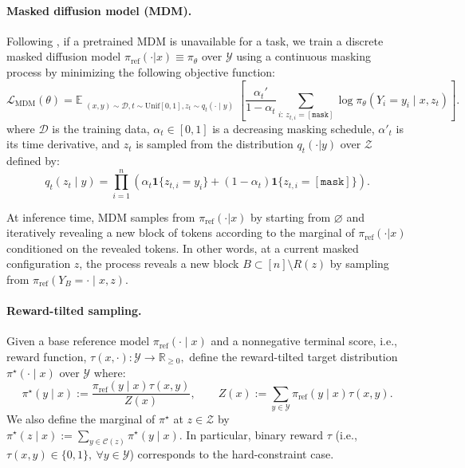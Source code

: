 \documentclass{article}
\numberwithin{theorem}{section}
\numberwithin{proposition}{section}
\numberwithin{corollary}{section}
\numberwithin{lemma}{section}
\numberwithin{conjecture}{section}
\numberwithin{remark}{section}
\numberwithin{definition}{section}
\numberwithin{assumption}{section}
\numberwithin{example}{section}
\newcommand{\calC}{{\mathcal{C}}}
\newcommand{\calY}{{\mathcal{Y}}}
\newcommand{\calZ}{{\mathcal{Z}}}
\newcommand{\lbra}[1]{\left[#1\right]}
\newcommand{\sbra}[1]{\left(#1\right)}
\providecommand{\base}{\pi_{\mathrm{ref}}}
\begin{document}
\paragraph{Masked diffusion model (MDM).}
Following \cite{sahoo2024simple}, if a pretrained MDM is unavailable for a task, we train a discrete masked diffusion model $\base(\cdot | x)\equiv \pi_\theta$ over $\calY $ using a continuous masking process by minimizing the following objective function: \begin{equation*}
    \mathcal L_{\mathrm{MDM}}(\theta) =\mathbb E_{\substack{(x,y)\sim\mathcal D,  t\sim\mathrm{Unif}[0,1],  z_t\sim q_t(\cdot\mid y)}}\lbra{\frac{\alpha_t'}{1-\alpha_t}\sum_{i:\,z_{t,i}=\mathtt{[mask]}}\log \pi_\theta(Y_i=y_i\mid x,z_t)}.
\end{equation*}
where $\mathcal{D}$ is the training data, $\alpha_t \in [0,1]$ is a decreasing masking schedule, $\alpha'_t$ is its time derivative, and $z_t$ is sampled from the distribution $q_t(\cdot | y)$ over $\mathcal{Z}$ defined by:
\begin{equation*}
    q_t(z_t\mid y) = \prod_{i=1}^n \sbra{\alpha_t \mathbf 1\{z_{t,i}=y_i\} + (1-\alpha_t)\mathbf 1\{z_{t,i}=\mathtt{[mask]}\}}.
\end{equation*}


At inference time, MDM samples from $\base(\cdot |x)$ by starting from $\varnothing$ and iteratively revealing a new block of tokens according to the marginal of $\base(\cdot |x)$ conditioned on the revealed tokens. In other words, at a  current masked configuration
$z$,  the process reveals a new block $B \subset [n]\setminus R(z)$ by sampling from  $\base(Y_B=\cdot \mid x,z)$.


\paragraph{Reward-tilted sampling.}


Given a base reference model $\base(\cdot\mid x)$ and a nonnegative terminal score, i.e., reward function, $\tau(x, \cdot): \calY\to \mathbb{R}_{\geq 0}, $ 
define the
reward-tilted target distribution $ \pi^\star( \cdot\mid x) $ over $\calY$ where:
\begin{equation*}
    \pi^\star(y\mid x)
    :=
    \frac{\base(y\mid x)\tau(x,y)}
    {Z(x)},
    \qquad
    Z(x):=\sum_{y\in\calY}\base(y\mid x)\tau(x,y).
\end{equation*}
We also define the marginal of $\pi^\star$ at $z\in \calZ$ by $\pi^\star(z\mid x) := \sum_{y\in\calC(z) } \pi^\star(y\mid x).$ In particular, binary reward $\tau $ (i.e., $\tau(x,y) \in \{0,1\}, \ \forall y \in \calY$) corresponds to the hard-constraint case.
\end{document}
